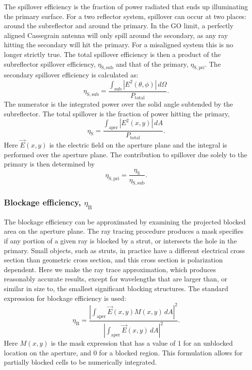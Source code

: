 \documentclass{article}
\begin{document}
The spillover efficiency is the fraction of power radiated that ends up
illuminating the primary surface.  For a two reflector system, spillover
can occur at two places: around the subreflector and around the primary.  In
the GO limit, a perfectly aligned Cassegrain antenna will only spill
around the secondary, as any ray hitting the secondary will hit the primary.
For a misaligned system this is no longer strictly true.  The total spillover
efficiency is then a product of the subreflector spillover efficiency,
$\eta_\mathrm{S,sub}$ and that of the primary, $\eta_\mathrm{S,pri}$.
The secondary spillover efficiency is calculated as:
\begin{equation}
\eta_\mathrm{S,sub} = \frac{\int_\mathrm{sub} \left|E^2(\theta, \phi)\right| 
	\, d \Omega}{P_\mathrm{total}}.
\end{equation}
The numerator is the integrated power over the solid angle subtended by the
subreflector.
The total spillover is the fraction of power hitting the primary,
\begin{equation}
\eta_\mathrm{S} = \frac{\int_\mathrm{aper} \left|E^2(x, y)\right| \, dA}
	{P_\mathrm{total}}.
\end{equation}
Here $\vec{E}(x, y)$ is the electric field on the aperture plane and the
integral is performed over the aperture plane.  The contribution to 
spillover due solely to the primary is then determined by
\begin{equation}
\eta_\mathrm{S,pri} = \frac{\eta_\mathrm{S}}{\eta_\mathrm{S,sub}}.
\end{equation}

\subsubsection{Blockage efficiency, $\eta_\mathrm{B}$}

The blockage efficiency can be approximated by examining the projected blocked
area on the aperture plane.   The ray tracing procedure produces a mask
specifies if any portion of a given ray is blocked by a strut, or intersects
the hole in the primary.  Small objects, such as struts, in practice
have a different electrical cross section than geometric cross section, and
this cross section is polarization dependent.  Here we make the ray trace
approximation, which produces reasonably accurate results, except for 
wavelengths that are larger than, or similar in size to, the smallest
significant blocking structures.  The standard expression for blockage
efficiency is used:
\begin{equation}
\eta_\mathrm{B} = 
\frac{\left|\int_\mathrm{aper} \vec{E}(x, y) M(x, y)\, dA\right|^2}
     {\left|\int_\mathrm{aper} \vec{E}(x, y) \, dA\right|^2}.
\end{equation}
Here $M(x, y)$ is the mask expression that has a value of 1 for an 
unblocked location on the aperture, and 0 for a blocked region.  This
formulation allows for partially blocked cells to be numerically
integrated.  
\end{document}
